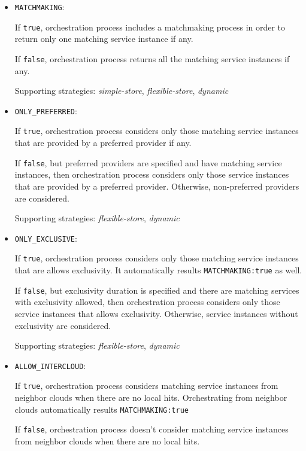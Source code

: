 \documentclass[a4paper]{arrowhead}
\begin{document}
\begin{itemize}
    \item \texttt{MATCHMAKING}:
    
    If \texttt{true}, orchestration process includes a matchmaking process in order to return only one matching service instance if any. 

    If \texttt{false}, orchestration process returns all the matching service instances if any. 

    Supporting strategies: \textit{simple-store}, \textit{flexible-store}, \textit{dynamic}
    
    \item \texttt{ONLY\_PREFERRED}:

    If \texttt{true}, orchestration process considers only those matching service instances that are provided by a preferred provider if any.

    If \texttt{false}, but preferred providers are specified and have matching service instances, then orchestration process considers only those service instances that are provided by a preferred provider. Otherwise, non-preferred providers are considered.

    Supporting strategies: \textit{flexible-store}, \textit{dynamic}
    
    \item \texttt{ONLY\_EXCLUSIVE}:

    If \texttt{true}, orchestration process considers only those matching service instances that are allows exclusivity. It automatically results \texttt{MATCHMAKING:true} as well.

    If \texttt{false}, but exclusivity duration is specified and there are matching services with exclusivity allowed, then orchestration process considers only those service instances that allows exclusivity. Otherwise, service instances without exclusivity are considered.

    Supporting strategies: \textit{flexible-store}, \textit{dynamic}
    
    \item \texttt{ALLOW\_INTERCLOUD}:

    If \texttt{true}, orchestration process considers matching service instances from neighbor clouds when there are no local hits. Orchestrating from neighbor clouds automatically results \texttt{MATCHMAKING:true}

    If \texttt{false}, orchestration process doesn't consider matching service instances from neighbor clouds when there are no local hits.


\end{itemize}
\end{document}
